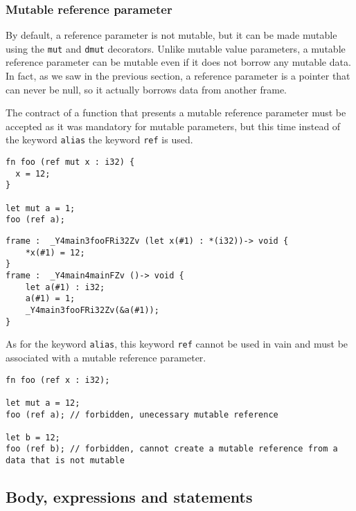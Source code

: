 

\subsubsection{Mutable reference parameter}
\label{sec:mut_ref_param}

By default, a reference parameter is not mutable, but it can be made mutable
using the \texttt{mut} and \texttt{dmut} decorators. Unlike mutable value
parameters, a mutable reference parameter can be mutable even if it does not
borrow any mutable data. In fact, as we saw in the previous section, a reference
parameter is a pointer that can never be null, so it actually borrows data from
another frame.

The contract of a function that presents a mutable reference parameter must be
accepted as it was mandatory for mutable parameters, but this time instead of
the keyword \texttt{alias} the keyword \texttt{ref} is used.

\begin{lstlisting}[style=coloredverbatim]
fn foo (ref mut x : i32) {
  x = 12;
}

let mut a = 1;
foo (ref a);
\end{lstlisting}

\begin {lstlisting}[style=intermediateVerb]
frame :  _Y4main3fooFRi32Zv (let x(#1) : *(i32))-> void {
    *x(#1) = 12;
}
frame :  _Y4main4mainFZv ()-> void {
    let a(#1) : i32;
    a(#1) = 1;
    _Y4main3fooFRi32Zv(&a(#1));
}
\end{lstlisting}

 As for the keyword
\texttt{alias}, this keyword \texttt{ref} cannot be used in vain and must be
associated with a mutable reference parameter.

\begin{lstlisting}[style=coloredverbatim]
fn foo (ref x : i32);

let mut a = 12;
foo (ref a); // forbidden, unecessary mutable reference

let b = 12;
foo (ref b); // forbidden, cannot create a mutable reference from a data that is not mutable
\end{lstlisting}

\subsection {Body, expressions and statements}
\label{sec:function_body}

